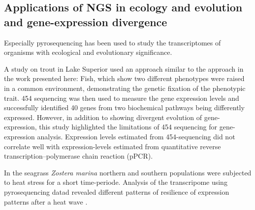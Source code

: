 \subsection{Applications of NGS in ecology and evolution and
  gene-expression divergence}

\label{sec:appl-ngs}


Especially pyrosequencing has been used to study the transcriptomes of
organisms with ecological and evolutionary significance.



A study on trout in Lake Superior \cite{pmid20331779} used an approach
similar to the approach in the work presented here: Fish, which show
two different phenotypes were raised in a common environment,
demonstrating the genetic fixation of the phenotypic trait. 454
sequencing was then used to measure the gene expression levels and
successfully identified 40 genes from two biochemical pathways being
differently expressed. However, in addition to showing divergent
evolution of gene-expression, this study highlighted the limitations
of 454 sequencing for gene-expression analysis. Expression levels
estimated from 454-sequencing did not correlate well with
expression-levels estimated from quantitative reverse
transcription–polymerase chain reaction (pPCR).

In the seagrass \textit{Zostera marina} northern and southern
populations were subjected to heat stress for a short time-periode.
Analysis of the transcripome using pyrosequencing datad revealed
different patterns of resilience of expression patterns after a heat
wave \cite{pmid22084086}.

